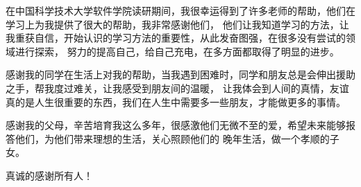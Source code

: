 
\begin{acknowledgements}



在中国科学技术大学软件学院读研期间，我很幸运得到了许多老师的帮助，他们在学习上为我提供了很大的帮助，我非常感谢他们，
他们让我知道学习的方法，让我重获自信，开始认识的学习方法的重要性，从此发奋图强，在很多没有尝试的领域进行探索，
努力的提高自己，给自己充电，在多方面都取得了明显的进步。

感谢我的同学在生活上对我的帮助，当我遇到困难时，同学和朋友总是会伸出援助之手，帮我度过难关，让我感受到朋友间的温暖，
让我体会到人间的真情，友谊真的是人生很重要的东西，我们在人生中需要多一些朋友，才能做更多的事情。

感谢我的父母，辛苦培育我这么多年，很感激他们无微不至的爱，希望未来能够报答他们，为他们带来理想的生活，关心照顾他们的
晚年生活，做一个孝顺的子女。

真诚的感谢所有人！

\end{acknowledgements}
